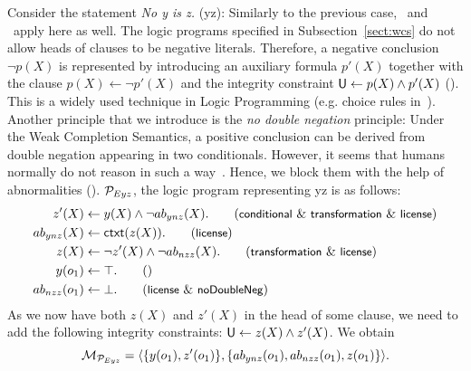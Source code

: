 \documentclass[12pt]{article}
\begin{document}
Consider the statement \textit{No y is z.} ({\ME yz}):
Similarly to the previous case, \licenses\ and \ apply here
as well.
The logic programs specified in Subsection~\ref{sect:wcs} 
do not allow heads of clauses to be negative literals. Therefore, a negative conclusion~$\neg p(X)$ is represented
by introducing an auxiliary formula $p'(X)$ together with the clause $p(X) \leftarrow \neg p'(X)$ and the integrity constraint $\mathsf{U} \leftarrow p(X) \wedge p'(X)$ (\transformation). This is a widely used technique in Logic Programming (e.g. choice rules in~\cite{GebserKaminskiKaufmannSchaub12}). 
Another principle that we introduce is the \emph{no double negation} principle: Under the Weak Completion Semantics, a positive conclusion can be derived from double negation appearing in two conditionals. However, it seems that humans normally do not reason in such a way~\cite{khemlani:2012}. Hence, we block them with the help of abnormalities (\dnegation). ${\cal P}_{Eyz}$, the logic program representing \ME yz is as follows:
\begin{align}
 z'(X) & \leftarrow y(X) \wedge \neg \Ab_{ynz}(X).  \tag{\conditionals\ \&\ \transformation\ \&\  \licenses} \\
\Ab_{ynz}(X)  & \leftarrow \cxt(z(X)).\tag{\licenses} \\
z(X) & \leftarrow \neg z'(X) \wedge \neg \Ab_{nzz}(X). \tag{\transformation\ \&\ \licenses} \\
y(o_1) & \leftarrow \top. \tag{} \\
\Ab_{nzz}(o_1) & \leftarrow \bot. \tag{\licenses\ \&\  \dnegation}
\end{align}
As we now have both $z(X)$ and $z'(X)$ in the head of some clause, we need to add the 
following integrity constraints: $\mathsf{U} \leftarrow z(X) \wedge
z'(X)$. We obtain 
\[{\cal M}_{{\cal P}_{Eyz}} = \langle \{y(o_1), z'(o_1)\},\{ab_{ynz}(o_1), ab_{nzz}(o_1),  z(o_1)\}
\rangle.
\]
\end{document}
